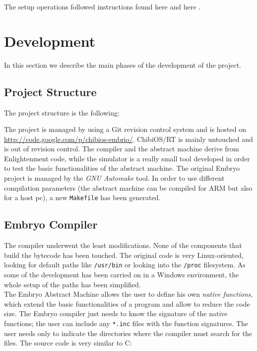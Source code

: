 \documentclass[a4paper,10pt]{article}
\begin{document}
\begin{multicols}{2}
The setup operations followed instructions found here \cite{setup1} and here \cite{setup2}.


\section{Development}

In this section we describe the main phases of the development of the project.


\subsection{Project Structure}

The project structure is the following:
\newline

\bigskip
The project is managed by using a Git revision control system and is hosted on \url{http://code.google.com/p/chibios-embrio/}. ChibiOS/RT is mainly untouched and is out of revision control. The compiler and the abstract machine derive from Enlightenment code, while the simulator is a really small tool developed in order to test the basic functionalities of the abstract machine. The original Embryo project is managed by the \textit{GNU Automake} tool. In order to use different compilation parameters (the abstract machine can be compiled for ARM but also for a host pc), a new \texttt{Makefile} has been generated.

\subsection{Embryo Compiler}

The compiler underwent the least modifications. None of the components that build the bytecode has been touched. The original code is very Linux-oriented, looking for default paths like \texttt{/usr/bin} or looking into the \texttt{/proc} filesystem. As some of the development has been carried on in a Windows environment, the whole setup of the paths has been simplified.\\
The Embryo Abstract Machine allows the user to define his own \textit{native functions}, which extend the basic functionalities of a program and allow to reduce the code size. The Embryo compiler just needs to know the signature of the native functions; the user can include any \texttt{*.inc} files with the function signatures. The user needs only to indicate the directories where the compiler must search for the files. The source code is very similar to C:


\end{multicols}
\end{document}
